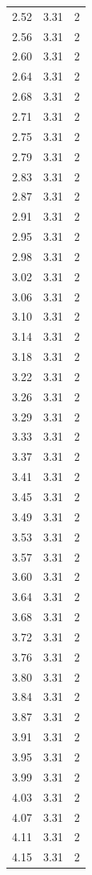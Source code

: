 \begin{longtable}{lrr}
  2.52 & 3.31 & 2 \\
  2.56 & 3.31 & 2 \\
  2.60 & 3.31 & 2 \\
  2.64 & 3.31 & 2 \\
  2.68 & 3.31 & 2 \\
  2.71 & 3.31 & 2 \\
  2.75 & 3.31 & 2 \\
  2.79 & 3.31 & 2 \\
  2.83 & 3.31 & 2 \\
  2.87 & 3.31 & 2 \\
  2.91 & 3.31 & 2 \\
  2.95 & 3.31 & 2 \\
  2.98 & 3.31 & 2 \\
  3.02 & 3.31 & 2 \\
  3.06 & 3.31 & 2 \\
  3.10 & 3.31 & 2 \\
  3.14 & 3.31 & 2 \\
  3.18 & 3.31 & 2 \\
  3.22 & 3.31 & 2 \\
  3.26 & 3.31 & 2 \\
  3.29 & 3.31 & 2 \\
  3.33 & 3.31 & 2 \\
  3.37 & 3.31 & 2 \\
  3.41 & 3.31 & 2 \\
  3.45 & 3.31 & 2 \\
  3.49 & 3.31 & 2 \\
  3.53 & 3.31 & 2 \\
  3.57 & 3.31 & 2 \\
  3.60 & 3.31 & 2 \\
  3.64 & 3.31 & 2 \\
  3.68 & 3.31 & 2 \\
  3.72 & 3.31 & 2 \\
  3.76 & 3.31 & 2 \\
  3.80 & 3.31 & 2 \\
  3.84 & 3.31 & 2 \\
  3.87 & 3.31 & 2 \\
  3.91 & 3.31 & 2 \\
  3.95 & 3.31 & 2 \\
  3.99 & 3.31 & 2 \\
  4.03 & 3.31 & 2 \\
  4.07 & 3.31 & 2 \\
  4.11 & 3.31 & 2 \\
  4.15 & 3.31 & 2 \\

\end{longtable}
